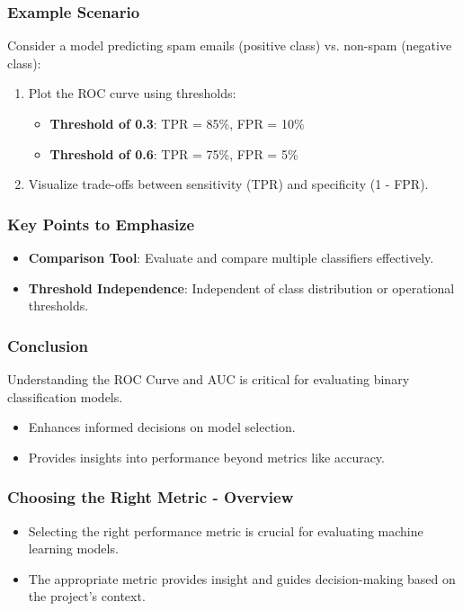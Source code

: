 \documentclass[aspectratio=169]{beamer}
\begin{document}
\begin{frame}[fragile]
    \frametitle{Example Scenario}
    Consider a model predicting spam emails (positive class) vs. non-spam (negative class):
    \begin{enumerate}
        \item Plot the ROC curve using thresholds:
        \begin{itemize}
            \item \textbf{Threshold of 0.3}: TPR = 85\%, FPR = 10\%
            \item \textbf{Threshold of 0.6}: TPR = 75\%, FPR = 5\%
        \end{itemize}
        \item Visualize trade-offs between sensitivity (TPR) and specificity (1 - FPR).
    \end{enumerate}
\end{frame}

\begin{frame}[fragile]
    \frametitle{Key Points to Emphasize}
    \begin{itemize}
        \item \textbf{Comparison Tool}: Evaluate and compare multiple classifiers effectively.
        \item \textbf{Threshold Independence}: Independent of class distribution or operational thresholds.
    \end{itemize}
\end{frame}

\begin{frame}[fragile]
    \frametitle{Conclusion}
    Understanding the ROC Curve and AUC is critical for evaluating binary classification models. 
    \begin{itemize}
        \item Enhances informed decisions on model selection.
        \item Provides insights into performance beyond metrics like accuracy.
    \end{itemize}
\end{frame}

\begin{frame}[fragile]
    \frametitle{Choosing the Right Metric - Overview}
    \begin{itemize}
        \item Selecting the right performance metric is crucial for evaluating machine learning models.
        \item The appropriate metric provides insight and guides decision-making based on the project's context.
    \end{itemize}
\end{frame}
\end{document}
